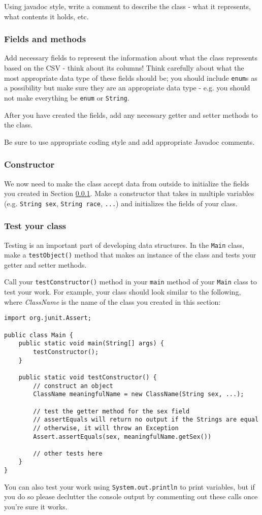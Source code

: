 \documentclass[12pt]{article}
\begin{document}
Using javadoc style, write a comment to describe the class - what it represents, what contents it holds, etc.

\subsubsection{Fields and methods}
\label{fields}
Add necessary fields to represent the information about what the class represents based on the CSV - think about its columns!  Think carefully about what the most appropriate data type of these fields should be; you should include \texttt{enum}s as a possibility but make sure they are an appropriate data type - e.g. you should not make everything be \texttt{enum} or \texttt{String}.

After you have created the fields, add any necessary getter and setter methods to the class.

Be sure to use appropriate coding style and add appropriate Javadoc comments.

\subsubsection{Constructor}
We now need to make the class accept data from outside to initialize the fields you created in Section \ref{fields}. Make a constructor that takes in multiple variables (e.g. \texttt{String sex}, \texttt{String race}, \texttt{...}) and initializes the fields of your class.

\subsubsection{Test your class}
\label{test}
Testing is an important part of developing data structures. In the \texttt{Main} class, make a \texttt{testObject()} method that makes an instance of the class and tests your getter and setter methods. 

Call your \texttt{testConstructor()} method in your \texttt{main} method of your \texttt{Main} class to test your work. For example, your class should look similar to the following, where \emph{ClassName} is the name of the class you created in this section:
\begin{verbatim}
import org.junit.Assert;

public class Main {
    public static void main(String[] args) {
        testConstructor();
    }
    
    public static void testConstructor() {
        // construct an object
        ClassName meaningfulName = new ClassName(String sex, ...);
        
        // test the getter method for the sex field
        // assertEquals will return no output if the Strings are equal
        // otherwise, it will throw an Exception
        Assert.assertEquals(sex, meaningfulName.getSex())
        
        // other tests here
    }
}

\end{verbatim}
You can also test your work using \texttt{System.out.println} to print variables, but if you do so please declutter the console output by commenting out these calls once you're sure it works.
\end{document}
